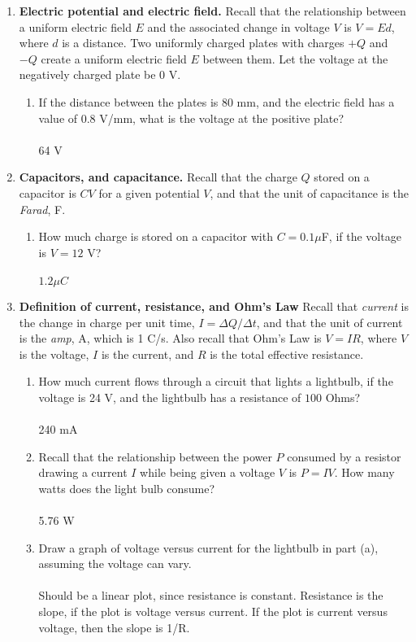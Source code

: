 \documentclass[10pt]{article}
\begin{document}
\begin{enumerate}
\item \textbf{Electric potential and electric field.} Recall that the relationship between a uniform electric field $E$ and the associated change in voltage $V$ is $V = Ed$, where $d$ is a distance.  Two uniformly charged plates with charges $+Q$ and $-Q$ create a uniform electric field $E$ between them.  Let the voltage at the negatively charged plate be 0 V.
\begin{enumerate}
\item 	If the distance between the plates is 80 mm, and the electric field has a value of 0.8 V/mm, what is the voltage at the positive plate? \\ \\ 64 V \\
\end{enumerate}
\item \textbf{Capacitors, and capacitance.} Recall that the charge $Q$ stored on a capacitor is $CV$ for a given potential $V$, and that the unit of capacitance is the \textit{Farad}, F.
\begin{enumerate}
\item How much charge is stored on a capacitor with $C = 0.1\mu$F, if the voltage is $V = 12$ V? \\ \\ $1.2 \mu C$ \\
\end{enumerate}
\item \textbf{Definition of current, resistance, and Ohm's Law} Recall that \textit{current} is the change in charge per unit time, $I = \Delta Q/\Delta t$, and that the unit of current is the \textit{amp}, A, which is 1 C/s.  Also recall that Ohm's Law is $V=IR$, where $V$ is the voltage, $I$ is the current, and $R$ is the total effective resistance.
\begin{enumerate}
\item How much current flows through a circuit that lights a lightbulb, if the voltage is 24 V, and the lightbulb has a resistance of $100$ Ohms? \\ \\ 240 mA \\
\item Recall that the relationship between the power $P$ consumed by a resistor drawing a current $I$ while being given a voltage $V$ is $P=IV$.  How many watts does the light bulb consume? \\ \\ 5.76 W \\
\item Draw a graph of voltage versus current for the lightbulb in part (a), assuming the voltage can vary.\\ \\ Should be a linear plot, since resistance is constant.  Resistance is the slope, if the plot is voltage versus current.  If the plot is current versus voltage, then the slope is 1/R. \\

\end{enumerate}
\end{enumerate}
\end{document}

